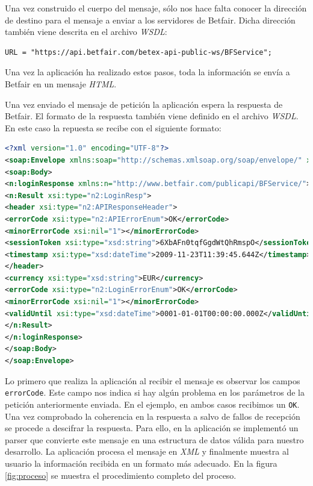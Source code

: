   Una vez construido el cuerpo del mensaje, sólo nos hace falta conocer la dirección de destino para el mensaje a enviar a los servidores de Betfair. Dicha dirección también viene descrita en el archivo \emph{WSDL}:
  
\begin{lstlisting}
URL = "https://api.betfair.com/betex-api-public-ws/BFService";
\end{lstlisting}

  Una vez la aplicación ha realizado estos pasos, toda la información se envía a Betfair en un mensaje \emph{HTML}. 
  
  Una vez enviado el mensaje de petición la aplicación espera la respuesta de Betfair. El formato de la respuesta también viene definido en el archivo \emph{WSDL}. En este caso la repuesta se recibe con el siguiente formato:

\begin{lstlisting}[language=xml] 
<?xml version="1.0" encoding="UTF-8"?>
<soap:Envelope xmlns:soap="http://schemas.xmlsoap.org/soap/envelope/" xmlns:xsi="http://www.w3.org/2001/XMLSchema-instance" xmlns:n2="http://www.betfair.com/publicapi/types/" xmlns:xsd="http://www.w3.org/2001/XMLSchema">
<soap:Body>
<n:loginResponse xmlns:n="http://www.betfair.com/publicapi/BFService/">
<n:Result xsi:type="n2:LoginResp">
<header xsi:type="n2:APIResponseHeader">
<errorCode xsi:type="n2:APIErrorEnum">OK</errorCode>
<minorErrorCode xsi:nil="1"></minorErrorCode>
<sessionToken xsi:type="xsd:string">6XbAFn0tqfGgdWtQhRmspO</sessionToken>
<timestamp xsi:type="xsd:dateTime">2009-11-23T11:39:45.644Z</timestamp>
</header>
<currency xsi:type="xsd:string">EUR</currency>
<errorCode xsi:type="n2:LoginErrorEnum">OK</errorCode>
<minorErrorCode xsi:nil="1"></minorErrorCode>
<validUntil xsi:type="xsd:dateTime">0001-01-01T00:00:00.000Z</validUntil>
</n:Result>
</n:loginResponse>
</soap:Body>
</soap:Envelope>
 \end{lstlisting}
 
  Lo primero que realiza la aplicación al recibir el mensaje es observar los campos \lstinline{errorCode}. Este campo nos indica si hay algún problema en los parámetros de la petición anteriormente enviada. En el ejemplo, en ambos casos recibimos un \lstinline{OK}. Una vez comprobado la coherencia en la respuesta a salvo de fallos de recepción se procede a descifrar la respuesta. Para ello, en la aplicación se implementó un parser que convierte este mensaje en una estructura de datos válida para nuestro desarrollo.  La aplicación procesa el mensaje en \emph{XML} y finalmente muestra al usuario la información recibida en un formato más adecuado. En la figura \ref{fig:proceso} se muestra el procedimiento completo del proceso.
       
